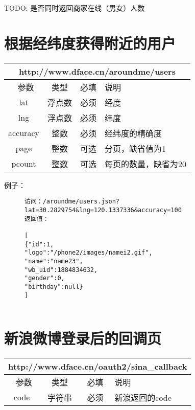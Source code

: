 \documentclass[cs4size]{ctexartutf8}
\begin{document}
     

TODO: 是否同时返回商家在线（男女）人数



\section{根据经纬度获得附近的用户}

\begin{table}[H]
   \begin{center}
\begin{tabular}{|c|c|c|p{12cm}|}
\hline
\multicolumn{4}{|c|}{http://www.dface.cn/aroundme/users} \\
\hline\hline
 \  参数  & 类型 & 必填 &  说明  \\
\hline
 lat  & 浮点数 & 必须 & 经度\\
\hline
 lng  &  浮点数 & 必须 & 纬度\\ 
\hline
 accuracy  & 整数 & 必须 & 经纬度的精确度\\ 
  \hline
 page  & 整数 & 可选 & 分页，缺省值为1\\ 
 \hline
 pcount  & 整数 & 可选 & 每页的数量，缺省为20\\ 
\hline
\end{tabular}
   \end{center}
\end{table}


例子：

\begin{figure}[H]
\begin{verbatim}
访问：/aroundme/users.json?lat=30.2829754&lng=120.1337336&accuracy=100
返回值：

[
{"id":1,
"logo":"/phone2/images/namei2.gif",
"name":"name23",
"wb_uid":1884834632,
"gender":0,
"birthday":null}
]


\end{verbatim}
\end{figure}


\section{新浪微博登录后的回调页}

\begin{table}[H]
   \begin{center}
\begin{tabular}{|c|c|c|p{12cm}|}
\hline
\multicolumn{4}{|c|}{http://www.dface.cn/oauth2/sina\_callback} \\
\hline\hline
 \  参数  & 类型 & 必填 &  说明  \\
\hline
 code  & 字符串 & 必须 &  新浪返回的code\\
\hline
\end{tabular}
   \end{center}
\end{table}
\end{document}
